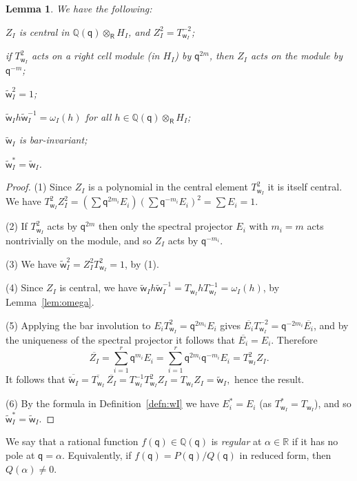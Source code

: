 \documentclass[11pt]{article}
\theoremstyle{plain}
\newtheorem{lemma}[thm]{Lemma}
\theoremstyle{definition}
\numberwithin{equation}{section}
\def\tw{\widetilde{\mathsf{w}}_I}
\def\QQ{\mathbb{Q}}
\def\RR{\mathbb{R}}
\def\sR{\mathsf{R}}
\newcommand{\sw}{\mathsf{w}}
\newcommand{\sq}{\mathsf{q}}
\begin{document}
\begin{lemma}\label{lem:basic}
We have the following:
\begin{compactenum}[$(1)$]
\item $Z_I$ is central in $\QQ(\sq)\otimes_{\sR}H_I$, and $Z_I^2=T_{\sw_I}^{-2}$;
\item if $T_{\sw_I}^2$ acts on a right cell module (in $H_I$) by $\sq^{2m}$, then $Z_I$ acts on the module by $\sq^{-m}$;
\item $\tw^2=1$;
\item $\tw h\tw^{-1}=\omega_I(h)$ for all $h\in \QQ(\sq)\otimes_{\sR}H_I$;
\item $\tw$ is bar-invariant;
\item $\tw^*=\tw$. 
\end{compactenum}
\end{lemma}

\begin{proof}
(1) Since $Z_I$ is a polynomial in the central element $T_{\sw_I}^2$ it is itself central. We have $T_{\sw_I}^2Z_I^2=\left(\sum \sq^{2m_i}E_i\right)\left(\sum \sq^{-m_i}E_i\right)^2=\sum E_i=1$. 

(2) If $T_{\sw_I}^2$ acts by $\sq^{2m}$ then only the spectral projector $E_i$ with $m_i=m$ acts nontrivially on the module, and so $Z_I$ acts by $\sq^{-m_i}$. 

(3) We have $\tw^2=Z_I^2T_{\sw_I}^2=1$, by (1). 

(4) Since $Z_I$ is central, we have $\tw h\tw^{-1}=T_{\sw_I}hT_{\sw_I}^{-1}=\omega_I(h)$, by Lemma~\ref{lem:omega}. 

(5) Applying the bar involution to $E_iT_{\sw_I}^2=\sq^{2m_i}E_i$ gives $\overline{E_i}T_{\sw_I}^{-2}=\sq^{-2m_i}\overline{E_i}$, and by the uniqueness of the spectral projector it follows that $\overline{E_i}=E_i$. Therefore 
$$\overline{Z_I}=\sum_{i=1}^r \sq^{m_i}E_i=\sum_{i=1}^r \sq^{2m_i}\sq^{-m_i}E_i=T_{\sw_I}^2Z_I.
$$ 
It follows that 
$
\overline{\tw}=\overline{T_{\sw_I}}\,\overline{Z_I}=T_{\sw_{I}}^{-1}T_{\sw_I}^2Z_I=T_{\sw_I}Z_I=\tw,
$
hence the result. 

(6) By the formula in Definition~\ref{defn:wI} we have $E_i^*=E_i$ (as $T_{\sw_I}^*=T_{\sw_I}$), and so $\tw^*=\tw$. 
\end{proof}



We say that a rational function $f(\sq)\in\QQ(\sq)$ is \textit{regular} at $\alpha\in\RR$ if it has no pole at $\sq=\alpha$. Equivalently, if $f(\sq)=P(\sq)/Q(\sq)$ in reduced form, then $Q(\alpha)\neq 0$.  
\end{document}
